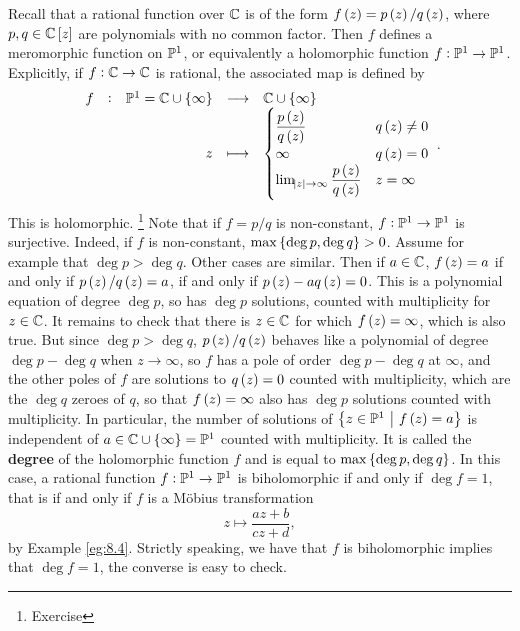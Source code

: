 \pagebreak

\begin{example}
Recall that a rational function over $ \mathbb{C} $ is of the form $ f\br{z} = p\br{z} / q\br{z} $, where $ p, q \in \CC\sbr{z} $ are polynomials with no common factor. Then $ f $ defines a meromorphic function on $ \mathbb{P}^1 $, or equivalently a holomorphic function $ f : \mathbb{P}^1 \to \mathbb{P}^1 $. Explicitly, if $ f : \mathbb{C} \to \mathbb{C} $ is rational, the associated map is defined by
$$ \function[f]{\PP^1 = \CC \cup \cbr{\infty}}{\CC \cup \cbr{\infty}}{z}{
\begin{cases}
\dfrac{p\br{z}}{q\br{z}} & q\br{z} \ne 0 \\
\infty & q\br{z} = 0 \\
\lim_{\abs{z} \to \infty} \dfrac{p\br{z}}{q\br{z}} & z = \infty
\end{cases}
}. $$
This is holomorphic. \footnote{Exercise} Note that if $ f = p / q $ is non-constant, $ f : \mathbb{P}^1 \to \mathbb{P}^1 $ is surjective. Indeed, if $ f $ is non-constant, $ \max\cbr{\deg p, \deg q} > 0 $. Assume for example that $ \deg p > \deg q $. Other cases are similar. Then if $ a \in \mathbb{C} $, $ f\br{z} = a $ if and only if $ p\br{z} / q\br{z} = a $, if and only if $ p\br{z} - aq\br{z} = 0 $. This is a polynomial equation of degree $ \deg p $, so has $ \deg p $ solutions, counted with multiplicity for $ z \in \mathbb{C} $. It remains to check that there is $ z \in \mathbb{C} $ for which $ f\br{z} = \infty $, which is also true. But since $ \deg p > \deg q $, $ p\br{z} / q\br{z} $ behaves like a polynomial of degree $ \deg p - \deg q $ when $ z \to \infty $, so $ f $ has a pole of order $ \deg p - \deg q $ at $ \infty $, and the other poles of $ f $ are solutions to $ q\br{z} = 0 $ counted with multiplicity, which are the $ \deg q $ zeroes of $ q $, so that $ f\br{z} = \infty $ also has $ \deg p $ solutions counted with multiplicity. In particular, the number of solutions of $ \cbr{z \in \PP^1 \st f\br{z} = a} $ is independent of $ a \in \CC \cup \cbr{\infty} = \PP^1 $ counted with multiplicity. It is called the \textbf{degree} of the holomorphic function $ f $ and is equal to $ \max\cbr{\deg p, \deg q} $. In this case, a rational function $ f : \mathbb{P}^1 \to \mathbb{P}^1 $ is biholomorphic if and only if $ \deg f = 1 $, that is if and only if $ f $ is a M\"obius transformation
$$ z \mapsto \dfrac{az + b}{cz + d}, $$
by Example \ref{eg:8.4}. Strictly speaking, we have that $ f $ is biholomorphic implies that $ \deg f = 1 $, the converse is easy to check.
\end{example}

